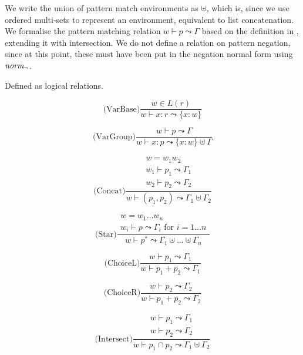 We write the union of pattern match environments as $\uplus$, which is, since we
use ordered multi-sets to represent an environment, equivalent to list
concatenation. We formalise the pattern matching relation $w \vdash p \leadsto
\Gamma$ based on the definition in \cite{pdpat}, extending it with
intersection. We do not define a relation on pattern negation, since at this
point, these must have been put in the negation normal form using $\mathit{norm_\neg}$.

\begin{defn}
   Defined as logical relations.

   \begin{minipage}{0.4\textwidth}
      \[\text{(VarBase)} \frac
         {w \in L(r)}
         {w \vdash x : r \leadsto \{x : w\}}
      \]
   \end{minipage}
   \begin{minipage}{0.5\textwidth}
      \[\text{(VarGroup)} \frac
         {w \vdash p \leadsto \Gamma}
         {w \vdash x : p \leadsto \{x : w\} \uplus \Gamma}
      \]
   \end{minipage}

   \begin{minipage}{0.4\textwidth}
      \[\text{(Concat)} \frac
         {\begin{array}{c}
            w = w_1 w_2 \\
            w_1 \vdash p_1 \leadsto \Gamma_1 \\
            w_2 \vdash p_2 \leadsto \Gamma_2
         \end{array}}     
         {w \vdash (p_1, p_2) \leadsto \Gamma_1 \uplus \Gamma_2}
      \]
   \end{minipage}
   \begin{minipage}{0.5\textwidth}
      \[\text{(Star)} \frac
         {\begin{array}{c}
            w = w_1 \dots w_n \\
            w_i \vdash p \leadsto \Gamma_i \text{ for } i = 1 \dots n
         \end{array}}     
         {w \vdash p^* \leadsto \Gamma_1 \uplus \dots \uplus \Gamma_n}
      \]
   \end{minipage}

   \begin{minipage}{0.4\textwidth}
      \[\text{(ChoiceL)} \frac
         {w \vdash p_1 \leadsto \Gamma_1}
         {w \vdash p_1 + p_2 \leadsto \Gamma_1}
      \]
   \end{minipage}
   \begin{minipage}{0.4\textwidth}
      \[\text{(ChoiceR)} \frac
         {w \vdash p_2 \leadsto \Gamma_2}
         {w \vdash p_1 + p_2 \leadsto \Gamma_2}
      \]
   \end{minipage}

   \[\text{(Intersect)} \frac
      {\begin{array}{c}
         w \vdash p_1 \leadsto \Gamma_1 \\
         w \vdash p_2 \leadsto \Gamma_2
      \end{array}}     
      {w \vdash p_1 \cap p_2 \leadsto \Gamma_1 \uplus \Gamma_2}
   \]

\end{defn}

